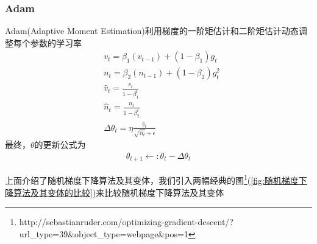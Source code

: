         \subsubsection{Adam}
            \par
            Adam(Adaptive Moment Estimation)利用梯度的一阶矩估计和二阶矩估计动态调整每个参数的学习率
            \begin{align*}
            &v_t = \beta_1(v_{t-1})+(1-\beta_1)g_t\\
            &n_t = \beta_2(n_{t-1})+(1-\beta_2)g_t^2\\
            &\hat{v}_t = \frac{v_t}{1-\beta_1^t}\\
            &\hat{n}_t = \frac{n_t}{1-\beta_2^t}\\
            &\Delta \theta_t = \eta \frac{\hat{v}_t}{\sqrt{\hat{n}_t}+\epsilon}
            \end{align*}
            最终，$\theta$的更新公式为
            \begin{align*}
            \theta_{t+1} \leftarrow:\theta_t - \Delta \theta_t
            \end{align*}
        \par
        上面介绍了随机梯度下降算法及其变体，我们引入两幅经典的图\footnote{http://sebastianruder.com/optimizing-gradient-descent/?url\_type=39\&object\_type=webpage\&pos=1}(\ref{fig:随机梯度下降算法及其变体的比较})来比较随机梯度下降算法及其变体
